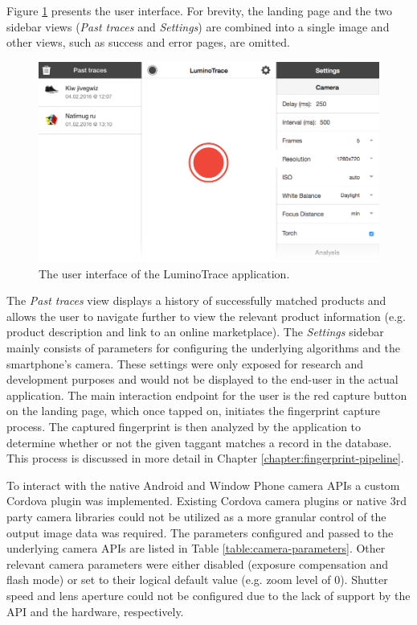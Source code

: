 \documentclass[thesis.tex]{subfiles}
\begin{document}
Figure \ref{figure:user_interface} presents the user interface. For brevity, the landing page and the two sidebar views (\emph{Past traces} and \emph{Settings}) are combined into a single image and other views, such as success and error pages, are omitted.

\begin{figure}[h]
\centering \includegraphics[width=13.5cm]{images/design_implementation/user_interface}
\caption{The user interface of the LuminoTrace application. \label{figure:user_interface}}
\end{figure}

The \emph{Past traces} view displays a history of successfully matched products and allows the user to navigate further to view the relevant product information (e.g. product description and link to an online marketplace). The \emph{Settings} sidebar mainly consists of parameters for configuring the underlying algorithms and the smartphone's camera. These settings were only exposed for research and development purposes and would not be displayed to the end-user in the actual application. The main interaction endpoint for the user is the red capture button on the landing page, which once tapped on, initiates the fingerprint capture process. The captured fingerprint is then analyzed by the application to determine whether or not the given taggant matches a record in the database. This process is discussed in more detail in Chapter \ref{chapter:fingerprint-pipeline}.

To interact with the native Android and Window Phone camera APIs a custom Cordova plugin was implemented. Existing Cordova camera plugins or native 3rd party camera libraries could not be utilized as a more granular control of the output image data was required. The parameters configured and passed to the underlying camera APIs are listed in Table \ref{table:camera-parameters}. Other relevant camera parameters were either disabled (exposure compensation and flash mode) or set to their logical default value (e.g. zoom level of 0). Shutter speed and lens aperture could not be configured due to the lack of support by the API and the hardware, respectively.
\end{document}
